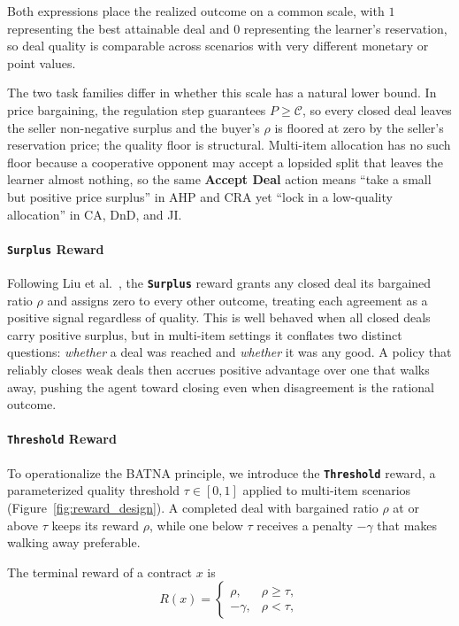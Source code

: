 \documentclass{interact}
\theoremstyle{plain}
\theoremstyle{definition}
\theoremstyle{remark}
\newcommand{\Threshold}{\textbf{\texttt{Threshold}}\xspace}
\newcommand{\Surplus}{\textbf{\texttt{Surplus}}\xspace}
\begin{document}
Both expressions place the realized outcome on a common scale, with $1$ representing the best attainable deal and $0$ representing the learner's reservation, so deal quality is comparable across scenarios with very different monetary or point values.

The two task families differ in whether this scale has a natural lower bound. In price bargaining, the regulation step guarantees $P \ge \mathcal{C}$, so every closed deal leaves the seller non-negative surplus and the buyer's $\rho$ is floored at zero by the seller's reservation price; the quality floor is structural. Multi-item allocation has no such floor because a cooperative opponent may accept a lopsided split that leaves the learner almost nothing, so the same \textbf{Accept Deal} action means ``take a small but positive price surplus'' in AHP and CRA yet ``lock in a low-quality allocation'' in CA, DnD, and JI.

\paragraph{\Surplus Reward}
Following Liu et al.~\cite{liu2026instructing}, the \Surplus reward grants any closed deal its bargained ratio $\rho$ and assigns zero to every other outcome, treating each agreement as a positive signal regardless of quality. This is well behaved when all closed deals carry positive surplus, but in multi-item settings it conflates two distinct questions: \emph{whether} a deal was reached and \emph{whether} it was any good. A policy that reliably closes weak deals then accrues positive advantage over one that walks away, pushing the agent toward closing even when disagreement is the rational outcome.


\paragraph{\Threshold Reward}
To operationalize the BATNA principle, we introduce the \Threshold reward, a parameterized quality threshold $\tau \in [0, 1]$ applied to multi-item scenarios (Figure~\ref{fig:reward_design}). A completed deal with bargained ratio $\rho$ at or above $\tau$ keeps its reward $\rho$, while one below $\tau$ receives a penalty $-\gamma$ that makes walking away preferable. 

The terminal reward of a contract $x$ is
\begin{equation}
R(x)=
\begin{cases}
\rho, & \rho \geq \tau,\\
-\gamma, & \rho < \tau,
\end{cases}
\label{eq:threshold_reward}
\end{equation}
\end{document}
